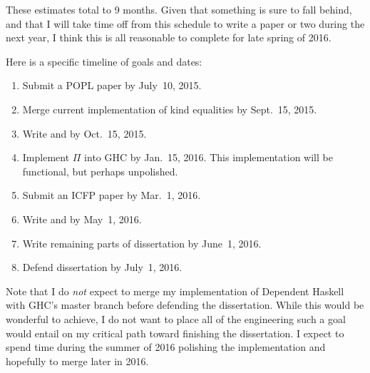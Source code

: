 \begin{proposal}
These estimates total to 9 months. Given that something is sure to fall behind,
and that I will take time off from this schedule to write a paper or two during
the next year, I think this is all reasonable to complete for late spring of 2016.

Here is a specific timeline of goals and dates:
\begin{enumerate}
\item Submit a POPL paper by July~10, 2015.
\item Merge current implementation of kind equalities by Sept.~15, 2015.
\item Write  and  by Oct.~15, 2015.
\item Implement $\Pi$ into GHC by Jan.~15, 2016. This implementation will
be functional, but perhaps unpolished.
\item Submit an ICFP paper by Mar.~1, 2016.
\item Write  and  by May~1, 2016.
\item Write remaining parts of dissertation by June~1, 2016.
\item Defend dissertation by July~1, 2016.
\end{enumerate}

Note that I do \emph{not} expect to merge my implementation of Dependent
Haskell with GHC's master branch before defending the dissertation. While this
would be wonderful to achieve, I do not want to place all of the engineering
such a goal would entail on my critical path toward finishing the
dissertation. I expect to spend time during the summer of 2016 polishing the
implementation and hopefully to merge later in 2016.

\end{proposal}
